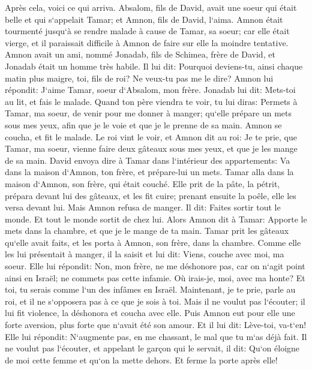 \verse Après cela, voici ce qui arriva. Absalom, fils de David, avait une soeur qui était belle et qui s`appelait Tamar; et Amnon, fils de David, l`aima. 
\verse Amnon était tourmenté jusqu`à se rendre malade à cause de Tamar, sa soeur; car elle était vierge, et il paraissait difficile à Amnon de faire sur elle la moindre tentative. 
\verse Amnon avait un ami, nommé Jonadab, fils de Schimea, frère de David, et Jonadab était un homme très habile. 
\verse Il lui dit: Pourquoi deviens-tu, ainsi chaque matin plus maigre, toi, fils de roi? Ne veux-tu pas me le dire? Amnon lui répondit: J`aime Tamar, soeur d`Absalom, mon frère. 
\verse Jonadab lui dit: Mets-toi au lit, et fais le malade. Quand ton père viendra te voir, tu lui diras: Permets à Tamar, ma soeur, de venir pour me donner à manger; qu`elle prépare un mets sous mes yeux, afin que je le voie et que je le prenne de sa main. 
\verse Amnon se coucha, et fit le malade. Le roi vint le voir, et Amnon dit au roi: Je te prie, que Tamar, ma soeur, vienne faire deux gâteaux sous mes yeux, et que je les mange de sa main. 
\verse David envoya dire à Tamar dans l`intérieur des appartements: Va dans la maison d`Amnon, ton frère, et prépare-lui un mets. 
\verse Tamar alla dans la maison d`Amnon, son frère, qui était couché. Elle prit de la pâte, la pétrit, prépara devant lui des gâteaux, et les fit cuire; 
\verse prenant ensuite la poêle, elle les versa devant lui. Mais Amnon refusa de manger. Il dit: Faites sortir tout le monde. Et tout le monde sortit de chez lui. 
\verse Alors Amnon dit à Tamar: Apporte le mets dans la chambre, et que je le mange de ta main. Tamar prit les gâteaux qu`elle avait faits, et les porta à Amnon, son frère, dans la chambre. 
\verse Comme elle les lui présentait à manger, il la saisit et lui dit: Viens, couche avec moi, ma soeur. 
\verse Elle lui répondit: Non, mon frère, ne me déshonore pas, car on n`agit point ainsi en Israël; ne commets pas cette infamie. 
\verse Où irais-je, moi, avec ma honte? Et toi, tu serais comme l`un des infâmes en Israël. Maintenant, je te prie, parle au roi, et il ne s`opposera pas à ce que je sois à toi. 
\verse Mais il ne voulut pas l`écouter; il lui fit violence, la déshonora et coucha avec elle. 
\verse Puis Amnon eut pour elle une forte aversion, plus forte que n`avait été son amour. Et il lui dit: Lève-toi, va-t`en! 
\verse Elle lui répondit: N`augmente pas, en me chassant, le mal que tu m`as déjà fait. 
\verse Il ne voulut pas l`écouter, et appelant le garçon qui le servait, il dit: Qu`on éloigne de moi cette femme et qu`on la mette dehors. Et ferme la porte après elle! 
